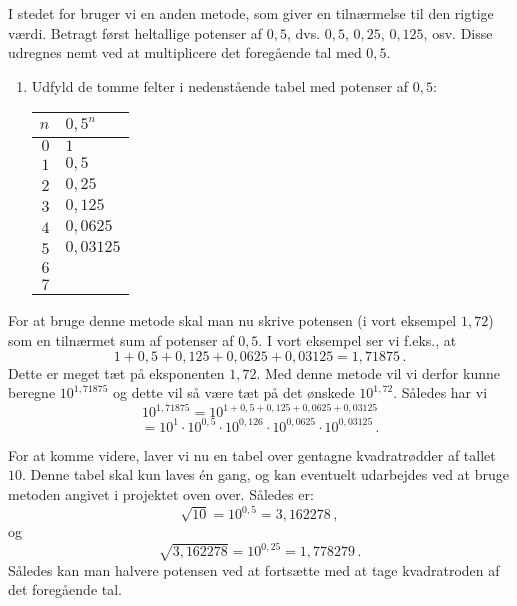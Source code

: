 \documentclass[12pt,oneside,a4paper]{article}
\theoremstyle{plain}
\begin{document}
I stedet for bruger vi en anden metode, som giver en tilnærmelse til den
rigtige værdi.  Betragt først heltallige potenser af $0,5$, dvs.
$0,5$, $0,25$, $0,125$, osv. Disse udregnes nemt ved at multiplicere
det foregående tal med $0,5$.
\begin{enumerate}[label=(\alph*)]
    \item Udfyld de tomme felter i nedenstående tabel med potenser af $0,5$:
        \begin{center}
            \begin{tabular}{|r|l|}
\hline
                $n$ & $0,5^n$ \\
                \hline
                $0$ & $1$ \\
                \hline
                $1$ & $0,5$ \\
                \hline
                $2$ & $0,25$ \\
                \hline
                $3$ & $0,125$ \\
                \hline
                $4$ & $0,0625$ \\
                \hline
                $5$ & $0,03125$ \\
                \hline
                $6$ &  \\
                \hline
                $7$ &  \\
                \hline
            \end{tabular}
        \end{center}
\end{enumerate}

For at bruge denne metode skal man nu skrive potensen (i vort eksempel $1,72$)
som en tilnærmet sum af potenser af $0,5$. I vort eksempel ser vi f.eks., at
\[
    1 + 0,5 + 0,125 + 0,0625 + 0,03125 = 1,71875 \,.
\]
Dette er meget tæt på eksponenten $1,72$. Med denne metode vil vi derfor kunne
beregne $10^{1,71875}$ og dette vil så være tæt på det ønskede $10^{1,72}$.
Således har vi
\[
    10^{1,71875} = 10^{1 + 0,5 + 0,125 + 0,0625 + 0,03125}
\]
\[
    = 10^1 \cdot 10^{0,5} \cdot 10^{0,126} \cdot 10^{0,0625} \cdot 10^{0,03125} \,.
\]

For at komme videre, laver vi nu en tabel over gentagne kvadratrødder af tallet
$10$. Denne tabel skal kun laves én gang, og kan eventuelt udarbejdes ved at
bruge metoden angivet i projektet oven over.  Således er:
\[
    \sqrt{10} = 10^{0,5} = 3,162278 \,,
\]
og
\[
    \sqrt{3,162278} = 10^{0,25} = 1,778279 \,.
\]
Således kan man halvere potensen ved at fortsætte med at tage kvadratroden af
det foregående tal.
\end{document}
